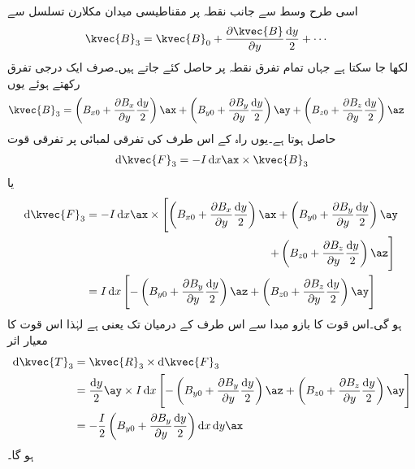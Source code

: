 اسی طرح وسط سے  جانب نقطہ  پر مقناطیسی میدان مکلارن تسلسل سے
\begin{align*}
\kvec{B}_3&=\kvec{B}_0 +\frac{\partial \kvec{B}}{\partial y}\frac{\dif y}{2}+\cdots
\end{align*}
لکھا جا سکتا ہے جہاں تمام تفرق نقطہ  پر حاصل کئے جاتے ہیں۔صرف ایک درجی تفرق رکھتے ہوئے یوں
\begin{align*}
\kvec{B}_3&=\left(B_{x0}+\frac{\partial B_{x}}{\partial y} \frac{\dif y}{2}\right)\ax+\left(B_{y0}+\frac{\partial B_{y}}{\partial y} \frac{\dif y}{2}\right)\ay+\left(B_{z0}+\frac{\partial B_{z}}{\partial y} \frac{\dif y}{2}\right)\az
\end{align*}
حاصل ہوتا ہے۔یوں راہ کے اس طرف کی  تفرقی لمبائی پر تفرقی قوت
\begin{align*}
\dif \kvec{F}_3=-I \dif x \ax \times \kvec{B}_3
\end{align*}
یا
\begin{align*}
\dif \kvec{F}_3&=-I \dif x \ax \times \left[\left(B_{x0}+\frac{\partial B_{x}}{\partial y} \frac{\dif y}{2}\right)\ax+\left(B_{y0}+\frac{\partial B_{y}}{\partial y} \frac{\dif y}{2}\right)\ay \right. \\
&\quad \quad \quad \quad\quad \quad \quad \quad\quad \quad \quad \quad\quad \quad \quad \quad \left.+\left(B_{z0}+\frac{\partial B_{z}}{\partial y} \frac{\dif y}{2}\right)\az\right]\\
&=I \dif x \left[-\left(B_{y0}+\frac{\partial B_{y}}{\partial y} \frac{\dif y}{2}\right)\az+\left(B_{z0}+\frac{\partial B_{z}}{\partial y} \frac{\dif y}{2}\right)\ay \right]
\end{align*}
ہو گی۔اس قوت کا بازو مبدا سے اس طرف کے درمیان تک  یعنی  ہے لہٰذا اس قوت کا معیار اثر
\begin{align*}
\dif \kvec{T}_3&=\kvec{R}_3 \times \dif \kvec{F}_3\\
&=\frac{\dif y}{2}\ay \times I \dif x \left[-\left(B_{y0}+\frac{\partial B_{y}}{\partial y} \frac{\dif y}{2}\right)\az+\left(B_{z0}+\frac{\partial B_{z}}{\partial y} \frac{\dif y}{2}\right)\ay \right]\\
&=-\frac{I}{2}\left(B_{y0}+\frac{\partial B_{y}}{\partial y} \frac{\dif y}{2}\right)\dif x \dif y\ax
\end{align*}
ہو گا۔ 

